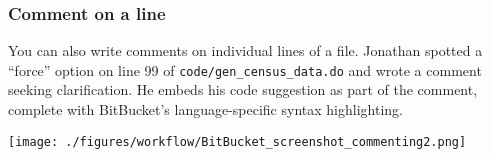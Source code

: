 \subsubsection{Comment on a line}
You can also write comments on individual lines of a file.
Jonathan spotted a ``force'' option on line 99 of \texttt{code/gen\_census\_data.do} and wrote a comment seeking clarification.
He embeds his code suggestion as part of the comment, complete with BitBucket's language-specific syntax highlighting.
\begin{center}\texttt{[image: ./figures/workflow/BitBucket\_screenshot\_commenting2.png]}\end{center}

